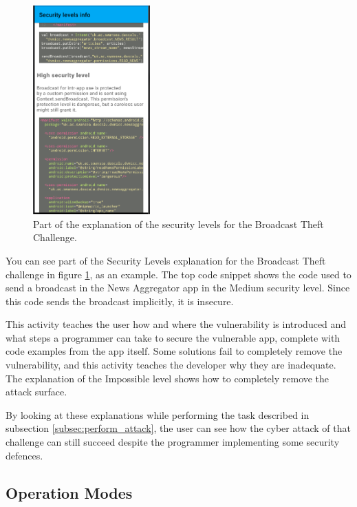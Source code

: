     \begin{figure}
        \centering
        \includegraphics[width=0.4\textwidth]{graphics/security_level_explanation.PNG}
        \caption{Part of the explanation of the security levels for the Broadcast Theft Challenge.}
        \label{fig:security_levels}
    \end{figure}
        
    You can see part of the Security Levels explanation for the Broadcast Theft challenge in figure \ref{fig:security_levels}, as an example. The top code snippet shows the code used to send a broadcast in the News Aggregator app in the Medium security level. Since this code sends the broadcast implicitly, it is insecure.
    
    This activity teaches the user how and where the vulnerability is introduced and what steps a programmer can take to secure the vulnerable app, complete with code examples from the app itself. Some solutions fail to completely remove the vulnerability, and this activity teaches the developer why they are inadequate. The explanation of the Impossible level shows how to completely remove the attack surface.
    
    By looking at these explanations while performing the task described in subsection \ref{subsec:perform_attack}, the user can see how the cyber attack of that challenge can still succeed despite the programmer implementing some security defences.
    
    \subsection{Operation Modes}
        \label{subsec:challenge_modes}
    
